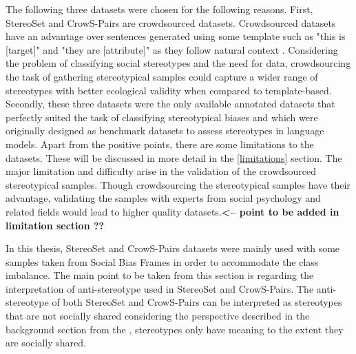 The following three datasets were chosen for the following reasons. First, StereoSet and CrowS-Pairs are crowdsourced datasets. Crowdsourced datasets have an advantage over sentences generated using some template such as "this is [target]" and "they are [attribute]" as they follow natural context \cite{nadeem2020stereoset}. Considering the problem of classifying social stereotypes and the need for data, crowdsourcing the task of gathering stereotypical samples could capture a wider range of stereotypes with better ecological validity when compared to template-based. Secondly, these three datasets were the only available annotated datasets that perfectly suited the task of classifying stereotypical biases and which were originally designed as benchmark datasets to assess stereotypes in language models. Apart from the positive points, there are some limitations to the datasets. These will be discussed in more detail in the \ref{limitations} section. The major limitation and difficulty arise in the validation of the crowdsourced stereotypical samples. Though crowdsourcing the stereotypical samples have their advantage, validating the samples with experts from social psychology and related fields would lead to higher quality datasets\cite{blodgett2021stereotyping}.\textbf{<-- point to be added in limitation section ??}

In this thesis, StereoSet and CrowS-Pairs datasets were mainly used with some samples taken from Social Bias Frames in order to accommodate the class imbalance. The main point to be taken from this section is regarding the interpretation of anti-stereotype used in StereoSet and CrowS-Pairs. The anti-stereotype of both StereoSet and CrowS-Pairs can be interpreted as stereotypes that are not socially shared considering the perspective described in the background section from the \cite{macrae1996stereotypes}, stereotypes only have meaning to the extent they are socially shared.
